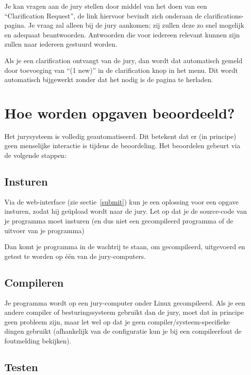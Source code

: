 Je kan vragen aan de jury stellen door middel van het doen van een
``Clarification Request'', de link hiervoor bevindt zich onderaan de
clarifications-pagina.  Je vraag zal alleen bij de jury aankomen; zij
zullen deze zo snel mogelijk en adequaat beantwoorden. Antwoorden die
voor iedereen relevant kunnen zijn zullen naar iedereen gestuurd worden.

Als je een clarification ontvangt van de jury, dan wordt dat
automatisch gemeld door toevoeging van ``(1 new)'' in de clarification
knop in het menu. Dit wordt automatisch bijgewerkt zonder dat het nodig
is de pagina te herladen.

\section{Hoe worden opgaven beoordeeld?}

Het \DOMjudge jurysysteem is volledig geautomatiseerd. Dit betekent
dat er (in principe) geen menselijke interactie is tijdens de
beoordeling. Het beoordelen gebeurt via de volgende stappen:

\subsection{Insturen}

Via%
de web-interface (zie sectie~\ref{submit}) kun je een oplossing voor
een opgave insturen, zodat hij ge\"upload wordt naar de jury. Let op
dat je de source-code van je programma moet insturen (en dus niet een
gecompileerd programma of de uitvoer van je programma)

Dan komt je programma in de wachtrij te staan, om gecompileerd,
uitgevoerd en getest te worden op \'e\'en van de jury-computers.

\subsection{Compileren}

Je programma wordt op een jury-computer onder Linux gecompileerd.
Als je een andere compiler of besturingssysteem gebruikt dan de jury,
moet dat in principe geen probleem zijn, maar let wel op dat
je geen compiler/systeem-specifieke dingen gebruikt (afhankelijk van
de configuratie kun je bij een compileerfout de foutmelding bekijken).

\subsection{Testen}

